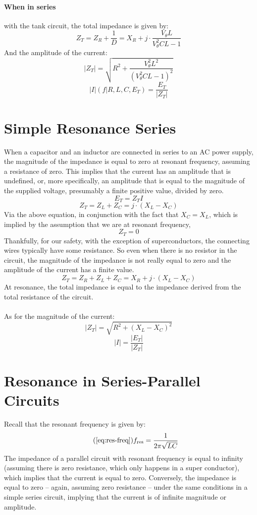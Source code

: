 \documentclass{article}
\begin{document}
	\paragraph[In Series]{When in series} with the tank circuit, the total 
	impedance is given by:
	$$ Z_T = Z_R + \frac{1}{D} = X_R  + j \cdot  \frac{V_\theta L}{V_\theta^2 
	CL -1}$$
	And the amplitude of the current:
	$$ |Z_T| = \sqrt{R^2 + \frac{V_\theta^2L^2}{(V_\theta^2CL - 1)^2}}$$
	$$ |I|(f \vert R, L, C, E_T) = \frac{E_T}{|Z_T|}$$
	\section[Series]{Simple Resonance Series}
	When a capacitor and an inductor are connected in series to an AC power 
	supply, the magnitude of the impedance is equal to zero at resonant 
	frequency, assuming a resistance of zero.  This implies that the current 
	has an amplitude that is undefined, or, more specifically, an amplitude 
	that is equal to the magnitude of the supplied voltage, presumably a finite 
	positive value, divided by zero.
	$$ E_T = Z_T I$$
	$$ Z_T = Z_L + Z_C = j \cdot (X_L - X_C)$$
	Via the above equation, in conjunction with the fact that $X_C=X_L$, which 
	is implied by the assumption that we are at resonant frequency,
	$$ Z_T = 0$$
	Thankfully, for our safety, with the exception of superconductors, the 
	connecting wires typically have some resistance.  So even when there is no 
	resistor in the circuit, the magnitude of the impedance is not really equal 
	to zero and the amplitude of the current has a finite value.
	$$  Z_T = Z_R + Z_L + Z_C = X_R + j\cdot (X_L - X_C)$$
	At resonance, the total impedance is equal to the impedance derived from 
	the total resistance of the circuit. \\ \\
	As for the magnitude of the current:
	$$ |Z_T| = \sqrt{R^2 + (X_L-X_C)^2}$$
	$$ |I| = \frac{|E_T|}{|Z_T|}$$
	
	\section[Series-Parallel]{Resonance in Series-Parallel Circuits}
	Recall that the resonant frequency is given by:
	\begin{equation}\tag{\ref{eq:res-freq}}
		f_{\text{res}}=\frac{1}{2\pi \sqrt{LC}}
	\end{equation}
	The impedance of a parallel circuit with resonant frequency is equal to 
	infinity (assuming there is zero resistance, which only happens in a super 
	conductor), which implies that the current is equal to zero.  Conversely, 
	the impedance is equal to zero -- again, assuming zero resistance -- under 
	the same conditions in a simple series circuit, implying that the current 
	is of infinite magnitude or 
	amplitude.
\end{document}
